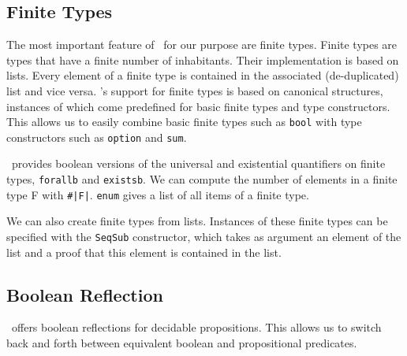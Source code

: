 \subsection{Finite Types} %

The most important feature of \ssreflect\ for our purpose are finite types. 
Finite types are types that have a finite number of inhabitants.
Their implementation is based on lists.
Every element of a finite type is contained in the associated (de-duplicated) list and vice versa.
\ssreflect's support for finite types is based on canonical structures, instances of which come predefined for basic finite types and type constructors. 
This allows us to easily combine basic finite types such as \lstinline{bool} with type constructors such as \lstinline{option} and \lstinline{sum}. 

\ssreflect\ provides boolean versions of the universal and existential quantifiers on finite types, \lstinline{forallb} and \lstinline{existsb}.
We can compute the number of elements in a finite type F with \lstinline{#|F|}.
\lstinline{enum} gives a list of all items of a finite type. 

We can also create finite types from lists.
Instances of these finite types can be specified with the \lstinline{SeqSub} constructor, 
which takes as argument an element of the list and a proof that this element is contained in the list.


\subsection{Boolean Reflection}
\ssreflect\ offers boolean reflections for decidable propositions. 
This allows us to switch back and forth between equivalent boolean and propositional predicates.

